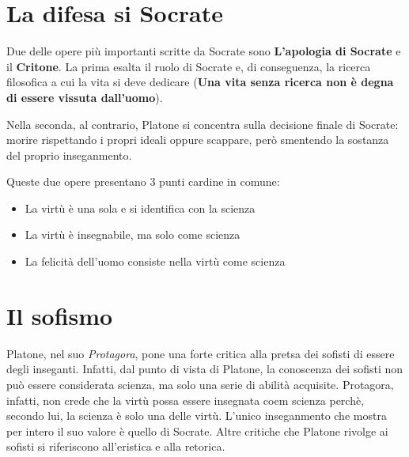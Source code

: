 \documentclass[10pt,a4paper]{article}
\begin{document}
   \section{La difesa si Socrate}

   Due delle opere più importanti scritte da Socrate sono \textbf{L'apologia di Socrate} e il \textbf{Critone}.
   La prima esalta il ruolo di Socrate e, di conseguenza, la ricerca filosofica a cui la vita si deve dedicare (\textbf{Una vita senza ricerca non è degna di essere vissuta dall'uomo}).

   Nella seconda, al contrario, Platone si concentra sulla decisione finale di Socrate: morire rispettando i propri ideali oppure scappare, però smentendo la sostanza del proprio inseganmento.

   Queste due opere presentano 3 punti cardine in comune:
   \begin{itemize}
     \item La virtù è una sola e si identifica con la scienza
     \item La virtù è insegnabile, ma solo come scienza
     \item La felicità dell'uomo consiste nella virtù come scienza
   \end{itemize}

   \section{Il sofismo}

   Platone, nel suo \textit{Protagora}, pone una forte critica alla pretsa dei sofisti di essere degli inseganti. Infatti, dal punto di vista di Platone, la conoscenza dei sofisti non può essere considerata scienza, ma solo una serie di abilità acquisite. Protagora, infatti, non crede che la virtù possa essere insegnata coem scienza perchè, secondo lui, la scienza è solo una delle virtù. L'unico inseganmento che mostra per intero il suo valore è quello di Socrate. Altre critiche che Platone rivolge ai sofisti si riferiscono all'eristica e alla retorica.
\end{document}

